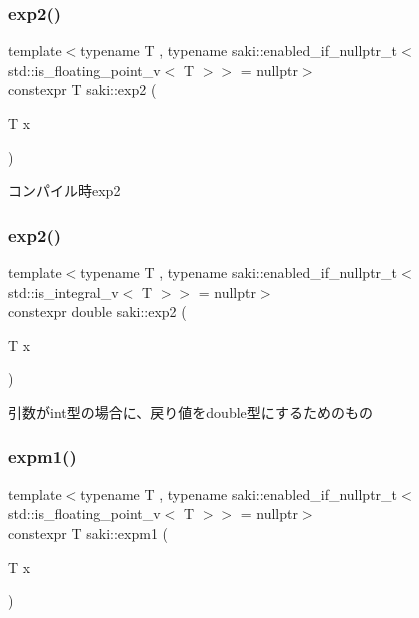 \subsubsection{\texorpdfstring{exp2()}{exp2()}\hspace{0.1cm}{\footnotesize\ttfamily [1/2]}}
{\footnotesize\ttfamily template$<$typename T , typename saki\+::enabled\+\_\+if\+\_\+nullptr\+\_\+t$<$ std\+::is\+\_\+floating\+\_\+point\+\_\+v$<$ T $>$$>$  = nullptr$>$ \\
constexpr T saki\+::exp2 (\begin{DoxyParamCaption}\item[{T}]{x }\end{DoxyParamCaption})}



コンパイル時exp2 

\mbox{\label{namespacesaki_a35e9ce74a5f65c8d38a4901bf513ac1e}} 
\subsubsection{\texorpdfstring{exp2()}{exp2()}\hspace{0.1cm}{\footnotesize\ttfamily [2/2]}}
{\footnotesize\ttfamily template$<$typename T , typename saki\+::enabled\+\_\+if\+\_\+nullptr\+\_\+t$<$ std\+::is\+\_\+integral\+\_\+v$<$ T $>$$>$  = nullptr$>$ \\
constexpr double saki\+::exp2 (\begin{DoxyParamCaption}\item[{T}]{x }\end{DoxyParamCaption})}



引数がint型の場合に、戻り値をdouble型にするためのもの 

\mbox{\label{namespacesaki_aabb63a6251c75f6f1e76a58f5438de69}} 
\subsubsection{\texorpdfstring{expm1()}{expm1()}\hspace{0.1cm}{\footnotesize\ttfamily [1/2]}}
{\footnotesize\ttfamily template$<$typename T , typename saki\+::enabled\+\_\+if\+\_\+nullptr\+\_\+t$<$ std\+::is\+\_\+floating\+\_\+point\+\_\+v$<$ T $>$$>$  = nullptr$>$ \\
constexpr T saki\+::expm1 (\begin{DoxyParamCaption}\item[{T}]{x }\end{DoxyParamCaption})}



